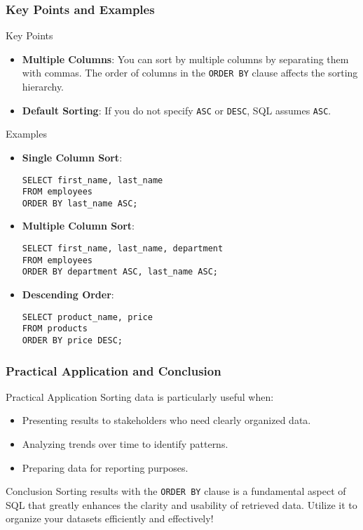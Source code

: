 \documentclass[aspectratio=169]{beamer}
\begin{document}
\begin{frame}[fragile]
    \frametitle{Key Points and Examples}
    \begin{block}{Key Points}
        \begin{itemize}
            \item \textbf{Multiple Columns}: You can sort by multiple columns by separating them with commas. The order of columns in the \texttt{ORDER BY} clause affects the sorting hierarchy.
            \item \textbf{Default Sorting}: If you do not specify \texttt{ASC} or \texttt{DESC}, SQL assumes \texttt{ASC}.
        \end{itemize}
    \end{block}
    
    \begin{block}{Examples}
        \begin{itemize}
            \item \textbf{Single Column Sort}:
            \begin{lstlisting}
SELECT first_name, last_name
FROM employees
ORDER BY last_name ASC;
            \end{lstlisting}
            
            \item \textbf{Multiple Column Sort}:
            \begin{lstlisting}
SELECT first_name, last_name, department
FROM employees
ORDER BY department ASC, last_name ASC;
            \end{lstlisting}
            
            \item \textbf{Descending Order}:
            \begin{lstlisting}
SELECT product_name, price
FROM products
ORDER BY price DESC;
            \end{lstlisting}
        \end{itemize}
    \end{block}
\end{frame}

\begin{frame}[fragile]
    \frametitle{Practical Application and Conclusion}
    \begin{block}{Practical Application}
        Sorting data is particularly useful when:
        \begin{itemize}
            \item Presenting results to stakeholders who need clearly organized data.
            \item Analyzing trends over time to identify patterns.
            \item Preparing data for reporting purposes.
        \end{itemize}
    \end{block}

    \begin{block}{Conclusion}
        Sorting results with the \texttt{ORDER BY} clause is a fundamental aspect of SQL that greatly enhances the clarity and usability of retrieved data. Utilize it to organize your datasets efficiently and effectively!
    \end{block}
\end{frame}
\end{document}

